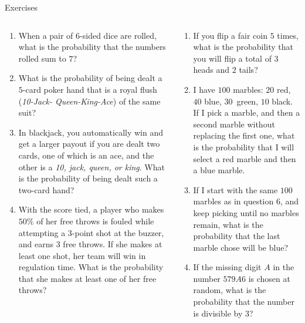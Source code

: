 \documentclass[9pt,aspectratio=169]{beamer}
\begin{document}
\begin{frame}{Exercises}
  \begin{columns}[T]
    \begin{column}{0.5\textwidth}
      \begin{enumerate}
        \item When a pair of $6$-sided dice are rolled, what is the probability that the numbers rolled sum to $7$?
        \item What is the probability of being dealt a $5$-card poker hand that is a royal flush (\emph{10-Jack- Queen-King-Ace}) of the same suit?
        \item In blackjack, you automatically win and get a larger payout if you are dealt two cards, one of which is an ace, and the other is a \emph{10, jack, queen, or king}.  What is the probability of being dealt such a two-card hand?
        \item With the score tied, a player who makes $50\%$ of her free throws is fouled while attempting a $3$-point shot at the buzzer, and earns $3$ free throws.  If she makes at least one shot, her team will win in regulation time.  What is the probability that she makes at least one of her free throws?
        \seti
      \end{enumerate}
    \end{column}
    \begin{column}{0.5\textwidth}
      \begin{enumerate}
        \conti
        \item If you flip a fair coin $5$ times, what is the probability that you will flip a total of $3$ heads and $2$ tails?
        \item I have $100$ marbles:  $20$ red, $40$ blue, $30$~green, $10$ black.  If I pick a marble, and then a second marble without replacing the first one, what is the probability that I will select a red marble and then a blue marble.
        \item If I start with the same $100$ marbles as in question {\color{darkOrange} 6}, and keep picking until no marbles remain, what is the probability that the last marble chose will be blue?
        \item If the missing digit $A$ in the number $579A6$ is chosen at random, what is the probability that the number is divisible by $3$?
      \end{enumerate}
    \end{column}
  \end{columns}
\end{frame}
\end{document}
